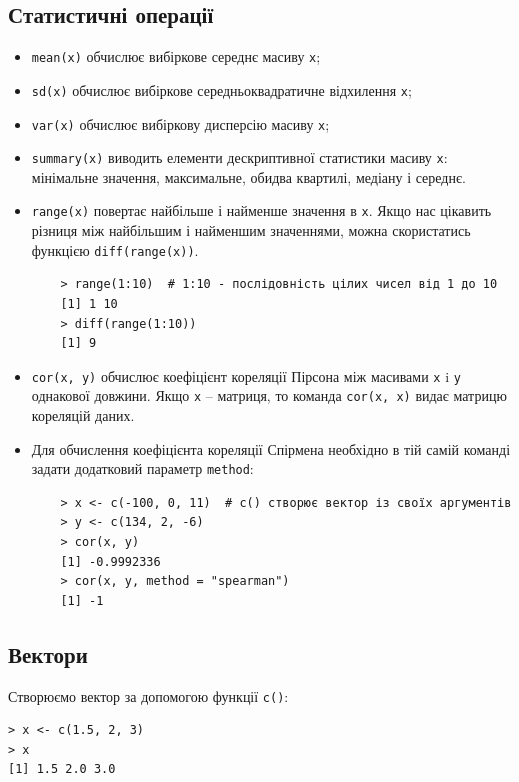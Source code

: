 \documentclass[a4paper, 12pt]{article}
\begin{document}
\subsection{Статистичні операції}
\begin{itemize}
	\item \verb|mean(x)| обчислює вибіркове середнє масиву \verb|х|;

	\item \verb|sd(x)| обчислює вибіркове середньоквадратичне відхилення \verb|х|;

	\item \verb|var(x)| обчислює вибіркову дисперсію масиву \verb|х|;

	\item \verb|summary(x)| виводить елементи дескриптивної статистики масиву \verb|х|: мінімальне значення, максимальне, обидва квартилі, медіану і середнє.

	\item \verb|range(x)| повертає найбільше і найменше значення в \verb|х|. Якщо нас цікавить різниця між найбільшим і найменшим значеннями, можна скористатись функцією \verb|diff(range(x))|. 

	\begin{verbatim}
	> range(1:10)  # 1:10 - послідовність цілих чисел від 1 до 10
	[1] 1 10
	> diff(range(1:10))
	[1] 9
	\end{verbatim}

	\item \verb|cor(x, y)| обчислює коефіцієнт кореляції Пірсона між масивами \verb|x| i \verb|y| однакової довжини. Якщо \verb|х| -- матриця, то команда \verb|cor(x, х)| видає матрицю кореляцій даних.

	\item Для обчислення коефіцієнта кореляції Спірмена необхідно в тій самій команді задати додатковий параметр \verb|method|:
	\begin{verbatim}
	> x <- c(-100, 0, 11)  # c() створює вектор із своїх аргументів
	> y <- c(134, 2, -6)
	> cor(x, y)
	[1] -0.9992336
	> cor(x, y, method = "spearman")
	[1] -1
	\end{verbatim}
\end{itemize}

\subsection{Вектори}

Створюємо вектор за допомогою функції \verb|c()|:
\begin{verbatim}
> x <- c(1.5, 2, 3)
> x
[1] 1.5 2.0 3.0
\end{verbatim}
\end{document}
